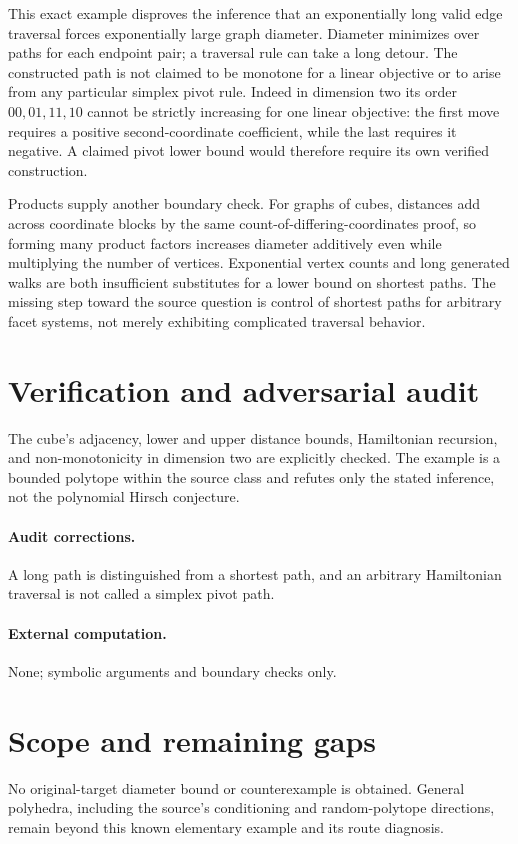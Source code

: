 \documentclass[11pt]{article}
\begin{document}
This exact example disproves the inference that an exponentially long valid edge traversal forces exponentially large graph diameter. Diameter minimizes over paths for each endpoint pair; a traversal rule can take a long detour. The constructed path is not claimed to be monotone for a linear objective or to arise from any particular simplex pivot rule. Indeed in dimension two its order $00,01,11,10$ cannot be strictly increasing for one linear objective: the first move requires a positive second-coordinate coefficient, while the last requires it negative. A claimed pivot lower bound would therefore require its own verified construction.

Products supply another boundary check. For graphs of cubes, distances add across coordinate blocks by the same count-of-differing-coordinates proof, so forming many product factors increases diameter additively even while multiplying the number of vertices. Exponential vertex counts and long generated walks are both insufficient substitutes for a lower bound on shortest paths. The missing step toward the source question is control of shortest paths for arbitrary facet systems, not merely exhibiting complicated traversal behavior.
\section{Verification and adversarial audit}
The cube's adjacency, lower and upper distance bounds, Hamiltonian recursion, and non-monotonicity in dimension two are explicitly checked. The example is a bounded polytope within the source class and refutes only the stated inference, not the polynomial Hirsch conjecture.
\paragraph{Audit corrections.} A long path is distinguished from a shortest path, and an arbitrary Hamiltonian traversal is not called a simplex pivot path.
\paragraph{External computation.} None; symbolic arguments and boundary checks only.
\section{Scope and remaining gaps}
No original-target diameter bound or counterexample is obtained. General polyhedra, including the source's conditioning and random-polytope directions, remain beyond this known elementary example and its route diagnosis.
\end{document}
